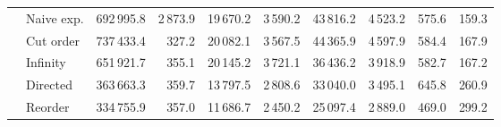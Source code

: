 \begin{tabular}{ll@{\hskip3pt}rrrrrrrr}
       & Naive exp. &                 692\,995.8 &          2\,873.9 &                                         19\,670.2 &                                           3\,590.2 &                                           43\,816.2 &                                             4\,523.2 &  575.6 &  159.3 \\
       & Cut order &                 737\,433.4 &           327.2 &                                         20\,082.1 &                                           3\,567.5 &                                           44\,365.9 &                                             4\,597.9 &  584.4 &  167.9 \\
       & Infinity &                 651\,921.7 &           355.1 &                                         20\,145.2 &                                           3\,721.1 &                                           36\,436.2 &                                             3\,918.9 &  582.7 &  167.2 \\
       & Directed &                 363\,663.3 &           359.7 &                                         13\,797.5 &                                           2\,808.6 &                                           33\,040.0 &                                             3\,495.1 &  645.8 &  260.9 \\
       & Reorder &                 334\,755.9 &           357.0 &                                         11\,686.7 &                                           2\,450.2 &                                           25\,097.4 &                                             2\,889.0 &  469.0 &  299.2 \\
\bottomrule
\end{tabular}

